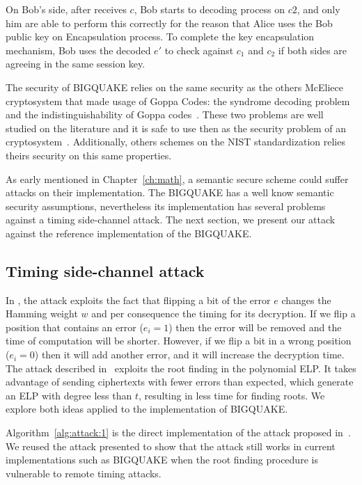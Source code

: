 On Bob's side, after receives $c$, Bob starts to decoding process on $c2$, and only him are able to perform this correctly for the reason that Alice uses the Bob public key on Encapsulation process. To complete the key encapsulation mechanism, Bob uses the decoded $e'$ to check against $c_1$ and $c_2$ if both sides are agreeing in the same session key.

The security of BIGQUAKE relies on the same security as the others McEliece cryptosystem that made usage of Goppa Codes: the syndrome decoding problem and the indistinguishability of Goppa codes~\cite{bardet2017big}. These two problems are well studied on the literature and it is safe to use then as the security problem of an cryptosystem~\cite{}. Additionally, others schemes on the NIST standardization relies theirs security on this same properties\cite{bernstein2017classic}.

As early mentioned in Chapter~\ref{ch:math}, a semantic secure scheme could suffer attacks on their implementation. The BIGQUAKE has a well know semantic security assumptions, nevertheless its implementation has several problems against a timing side-channel attack. The next section, we present our attack against the reference implementation of the BIGQUAKE. 

\subsection{Timing side-channel attack}
In \cite{shoufan2009timing}, the attack exploits the fact that flipping a bit of the error $e$ changes the Hamming weight $w$ and per consequence the timing for its decryption. If we flip a position that contains an error ($e_i = 1$) then the error will be removed and the time of computation will be shorter. However, if we flip a bit in a wrong position ($e_i = 0$) then it will add another error, and it will increase the decryption time. The attack described in~\cite{bucerzan2017improved} exploits the root finding in the polynomial ELP. It takes advantage of sending ciphertexts with fewer errors than expected, which generate an ELP with degree less than $t$, resulting in less time for finding roots. We explore both ideas applied to the implementation of BIGQUAKE.

Algorithm~\ref{alg:attack:1} is the direct implementation of the attack proposed in~\cite{shoufan2009timing}. We reused the attack presented to show that the attack still works in current implementations such as BIGQUAKE when the root finding procedure is vulnerable to remote timing attacks.

